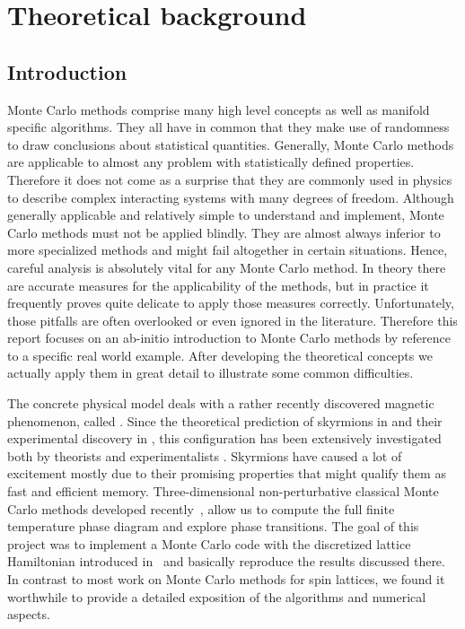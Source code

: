 %
\chapter{Theoretical background}\label{chap:1}
%
\section{Introduction}\label{sec:intro}
%
Monte Carlo methods comprise many high level concepts as well as manifold
specific algorithms. They all have in common that they make use of randomness to
draw conclusions about statistical quantities. Generally, Monte Carlo methods
are applicable to almost any problem with statistically defined properties.
Therefore it does not come as a surprise that they are commonly used in physics
to describe complex interacting systems with many degrees of freedom. Although
generally applicable and relatively simple to understand and implement, Monte
Carlo methods must not be applied blindly. They are almost always inferior to
more specialized methods and might fail altogether in certain situations. Hence,
careful analysis is absolutely vital for any Monte Carlo method. In theory there
are accurate  measures for the applicability of the methods, but in practice it
frequently proves quite delicate to apply those measures correctly.
Unfortunately, those pitfalls are often overlooked or even ignored in the
literature. Therefore this report focuses on an ab-initio introduction to Monte
Carlo methods by reference to a specific real world example. After developing
the theoretical concepts we actually apply them in great detail to illustrate
some common difficulties.

The concrete physical model deals with a rather recently discovered magnetic
phenomenon, called . Since the theoretical prediction of
skyrmions in   and their experimental discovery in
 , this configuration has been extensively investigated
both by theorists and experimentalists . Skyrmions have caused a
lot of excitement mostly due to their promising properties that might qualify
them as fast and efficient memory. Three-dimensional non-perturbative classical
Monte Carlo methods developed recently~\cite{skyrmionlattice}, allow us to
compute the full finite temperature phase diagram and explore phase transitions.
The goal of this project was to implement a Monte Carlo code with the
discretized lattice Hamiltonian introduced in~\cite{skyrmionlattice} and
basically reproduce the results discussed there. In contrast to most work on
Monte Carlo methods for spin lattices, we found it worthwhile to provide a
detailed exposition of the algorithms and numerical aspects.

